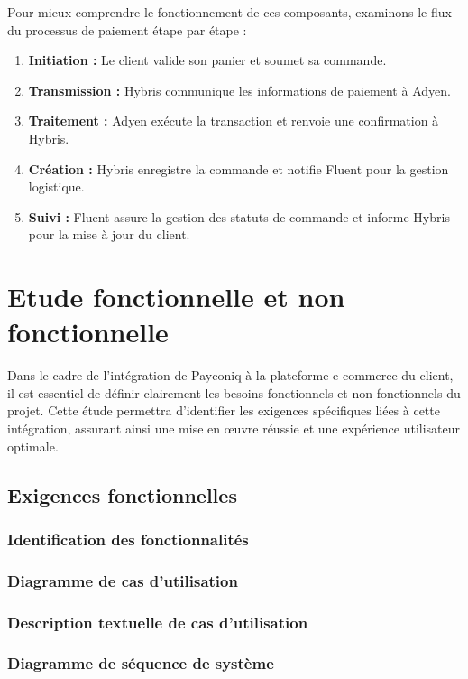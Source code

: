 Pour mieux comprendre le fonctionnement de ces composants, examinons le flux du processus de paiement étape par étape :
\begin{enumerate}
    \item \textbf{Initiation :} Le client valide son panier et soumet sa commande.
    \item \textbf{Transmission :} Hybris communique les informations de paiement à Adyen.
    \item \textbf{Traitement :} Adyen exécute la transaction et renvoie une confirmation à Hybris.
    \item \textbf{Création :} Hybris enregistre la commande et notifie Fluent pour la gestion logistique.
    \item \textbf{Suivi :} Fluent assure la gestion des statuts de commande et informe Hybris pour la mise à jour du client.
\end{enumerate}
\section{Etude fonctionnelle et non fonctionnelle}

Dans le cadre de l'intégration de Payconiq à la plateforme e-commerce du client, il est essentiel de définir clairement les besoins fonctionnels et non fonctionnels du projet. 
Cette étude permettra d'identifier les exigences spécifiques liées à cette intégration, assurant ainsi une mise en œuvre réussie et une expérience utilisateur optimale. 
\subsection{Exigences fonctionnelles}

\subsubsection{Identification des fonctionnalités}


\subsubsection{Diagramme de cas d’utilisation}


\subsubsection{Description textuelle de cas d’utilisation}


\subsubsection{Diagramme de séquence de système}

